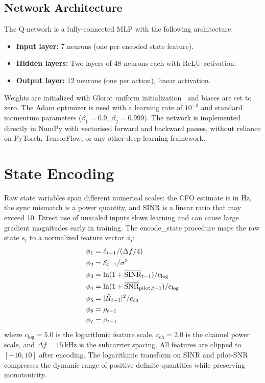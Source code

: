 \subsection{Network Architecture}

The Q-network is a fully-connected MLP with the following architecture:
\begin{itemize}
    \item \textbf{Input layer:} 7 neurons (one per encoded state feature).
    \item \textbf{Hidden layers:} Two layers of 48 neurons each with ReLU activation.
    \item \textbf{Output layer:} 12 neurons (one per action), linear activation.
\end{itemize}
Weights are initialized with Glorot uniform initialization~\cite{sutton2018reinforcement} and biases are set to zero. The Adam optimizer is used with a learning rate of $10^{-3}$ and standard momentum parameters ($\beta_1 = 0.9$, $\beta_2 = 0.999$). The network is implemented directly in NumPy with vectorised forward and backward passes, without reliance on PyTorch, TensorFlow, or any other deep-learning framework.

\section{State Encoding}

Raw state variables span different numerical scales: the CFO estimate is in Hz, the sync mismatch is a power quantity, and SINR is a linear ratio that may exceed 10. Direct use of unscaled inputs slows learning and can cause large gradient magnitudes early in training. The encode\_state procedure maps the raw state $s_t$ to a normalized feature vector $\phi_t$:
\begin{align}
    \phi_1 &= \hat{\varepsilon}_{t-1} / (\Delta f / 4) \label{eq:enc_cfo}\\
    \phi_2 &= \mathcal{E}_{t-1} / \sigma^2 \label{eq:enc_mismatch}\\
    \phi_3 &= \ln(1 + \overline{\text{SINR}}_{t-1}) / c_{\log} \label{eq:enc_sinr}\\
    \phi_4 &= \ln(1 + \overline{\text{SNR}}_{\text{pilot},t-1}) / c_{\log} \label{eq:enc_psnr}\\
    \phi_5 &= |\hat{H}_{t-1}|^2 / c_{\text{ch}} \label{eq:enc_chpow}\\
    \phi_6 &= \rho_{t-1} \label{eq:enc_rho}\\
    \phi_7 &= \beta_{t-1} \label{eq:enc_beta}
\end{align}
where $c_{\log} = 5.0$ is the logarithmic feature scale, $c_{\text{ch}} = 2.0$ is the channel power scale, and $\Delta f = 15\,\text{kHz}$ is the subcarrier spacing. All features are clipped to $[-10, 10]$ after encoding. The logarithmic transform on SINR and pilot-SNR compresses the dynamic range of positive-definite quantities while preserving monotonicity.

